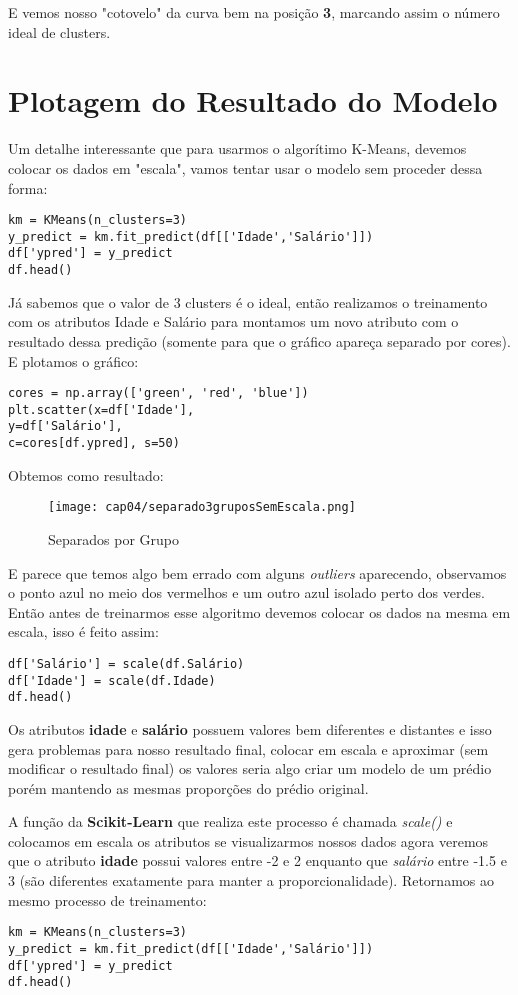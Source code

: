 E vemos nosso "cotovelo" da curva bem na posição \textbf{3}, marcando assim o número ideal de clusters.

\section{Plotagem do Resultado do Modelo}
Um detalhe interessante que para usarmos o algorítimo K-Means, devemos colocar os dados em "escala", vamos tentar usar o modelo sem proceder dessa forma:
\begin{lstlisting}[]
km = KMeans(n_clusters=3)
y_predict = km.fit_predict(df[['Idade','Salário']])
df['ypred'] = y_predict
df.head()
\end{lstlisting}

Já sabemos que o valor de 3 clusters é o ideal, então realizamos o treinamento com os atributos Idade e Salário para montamos um novo atributo com o resultado dessa predição (somente para que o gráfico apareça separado por cores). E plotamos o gráfico:
\begin{lstlisting}[]
cores = np.array(['green', 'red', 'blue'])
plt.scatter(x=df['Idade'],
y=df['Salário'],
c=cores[df.ypred], s=50)
\end{lstlisting}

Obtemos como resultado:
\begin{figure}[H]
	\centering
	\texttt{[image: cap04/separado3gruposSemEscala.png]}
	\caption{Separados por Grupo}
\end{figure}

E parece que temos algo bem errado com alguns \textit{outliers} aparecendo, observamos o ponto azul no meio dos vermelhos e um outro azul isolado perto dos verdes. Então antes de treinarmos esse algoritmo devemos colocar os dados na mesma em escala, isso é feito assim:
\begin{lstlisting}[]
df['Salário'] = scale(df.Salário)
df['Idade'] = scale(df.Idade)
df.head()
\end{lstlisting}

Os atributos \textbf{idade} e \textbf{salário} possuem valores bem diferentes e distantes e isso gera problemas para nosso resultado final, colocar em escala e aproximar (sem modificar o resultado final) os valores seria algo criar um modelo de um prédio porém mantendo as mesmas proporções do prédio original.

A função da \textbf{Scikit-Learn} que realiza este processo é chamada \textit{scale()} e colocamos em escala os atributos se visualizarmos nossos dados agora veremos que o atributo \textbf{idade} possui valores entre -2 e 2 enquanto que \textit{salário} entre -1.5 e 3 (são diferentes exatamente para manter a proporcionalidade). Retornamos ao mesmo processo de treinamento:
\begin{lstlisting}[]
km = KMeans(n_clusters=3)
y_predict = km.fit_predict(df[['Idade','Salário']])
df['ypred'] = y_predict
df.head()
\end{lstlisting}

